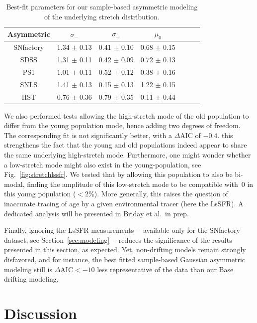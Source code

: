 \documentclass[]{aa} %
\begin{document}
\begin{table}
    \centering
    \caption{Best-fit parameters for our sample-based asymmetric modeling of the
    underlying stretch distribution.}
    \label{tab:bbc}
    \begin{tabular}{ccccccc}
    \hline\hline
    Asymmetric & $\sigma_{-}$    & $\sigma_{+}$    & $\mu_0$ \\
    \hline
    SNfactory  & 1.34 $\pm$ 0.13 & 0.41 $\pm$ 0.10 & 0.68 $\pm$ 0.15 \\
    SDSS       & 1.31 $\pm$ 0.11 & 0.42 $\pm$ 0.09 & 0.72 $\pm$ 0.13 \\
    PS1        & 1.01 $\pm$ 0.11 & 0.52 $\pm$ 0.12 & 0.38 $\pm$ 0.16 \\
    SNLS       & 1.41 $\pm$ 0.13 & 0.15 $\pm$ 0.13 & 1.22 $\pm$ 0.15 \\
    HST        & 0.76 $\pm$ 0.36 & 0.79 $\pm$ 0.35 & 0.11 $\pm$ 0.44 \\
    \hline
    \end{tabular}
\end{table}
    
We also performed tests allowing the high-stretch mode of the old population to
differ from the young population mode, hence adding two degrees of freedom. The
corresponding fit is not significantly better, with a $\Delta$AIC of $-0.4$.
this strengthens the fact that the young and old populations indeed appear to
share the same underlying high-stretch mode.  Furthermore, one might wonder
whether a low-stretch mode might also exist in the young-population, see
Fig.~\ref{fig:stretchlssfr}. We tested that by allowing this population to also
be bi-modal, finding the amplitude of this low-stretch mode to be compatible
with~0 in this young population ($<2\%$). More generally, this raises the
question of inaccurate tracing of age by a given environmental tracer (here the
LsSFR). A dedicated analysis will be presented in Briday et al.\ in prep.

Finally, ignoring
the LsSFR measurements --~available only for the SNfactory dataset, see
Section~\ref{sec:modeling}~-- reduces the significance of the results
presented in this section, as expected. Yet, non-drifting models remain strongly
disfavored, and for instance, the best fitted sample-based Gaussian asymmetric
modeling still is $\Delta\mathrm{AIC}<-10$ less representative of the data than
our Base drifting modeling.

\section{Discussion}\label{sec:discussion}
\end{document}
